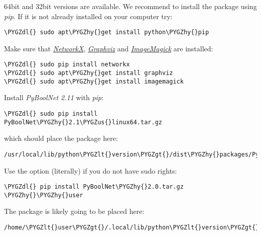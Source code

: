 \documentclass[letterpaper,10pt,english]{sphinxmanual}
\def\PYGZus{\char`\_}
\def\PYGZlt{\char`\<}
\def\PYGZgt{\char`\>}
\def\PYGZdl{\char`\$}
\def\PYGZhy{\char`\-}
\begin{document}
64bit and 32bit versions are available. We recommend to install the package using \emph{pip}. If it is not already installed on your computer try:

\begin{Verbatim}[commandchars=\\\{\}]
\PYGZdl{} sudo apt\PYGZhy{}get install python\PYGZhy{}pip
\end{Verbatim}

Make sure that {\hyperref[Installation:installation-networkx]{\emph{NetworkX}}}, {\hyperref[Installation:installation-graphviz]{\emph{Graphviz}}} and {\hyperref[Installation:installation-imagemagick]{\emph{ImageMagick}}} are installed:

\begin{Verbatim}[commandchars=\\\{\}]
\PYGZdl{} sudo pip install networkx
\PYGZdl{} sudo apt\PYGZhy{}get install graphviz
\PYGZdl{} sudo apt\PYGZhy{}get install imagemagick
\end{Verbatim}

Install \emph{PyBoolNet 2.11} with \emph{pip}:

\begin{Verbatim}[commandchars=\\\{\}]
\PYGZdl{} sudo pip install PyBoolNet\PYGZhy{}2.1\PYGZus{}linux64.tar.gz
\end{Verbatim}

which should place the package here:

\begin{Verbatim}[commandchars=\\\{\}]
/usr/local/lib/python\PYGZlt{}version\PYGZgt{}/dist\PYGZhy{}packages/PyBoolNet
\end{Verbatim}

Use the option  (literally) if you do not have sudo rights:

\begin{Verbatim}[commandchars=\\\{\}]
\PYGZdl{} pip install PyBoolNet\PYGZhy{}2.0.tar.gz \PYGZhy{}\PYGZhy{}user
\end{Verbatim}

The package is likely going to be placed here:

\begin{Verbatim}[commandchars=\\\{\}]
/home/\PYGZlt{}user\PYGZgt{}/.local/lib/python\PYGZlt{}version\PYGZgt{}/dist\PYGZhy{}packages/PyBoolNet
\end{Verbatim}
\end{document}
